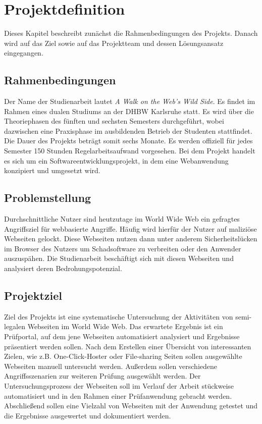 \documentclass[
	pdftex,
	fontsize=12pt,          %
	DIV10,                  %
	ngerman,                %
	paper=a4,               %
	twoside=false,          %
	titlepage,              %
	parskip=half,           %
	headings=normal,        %
	listof=nochaptergap,  %
	bibliography=totoc, %
	index=totoc,            %
	captions=tableheading,  %
	final                 %
]{scrreprt}
\begin{document}
\newpage
\chapter{Projektdefinition}

Dieses Kapitel beschreibt zunächst die Rahmenbedingungen des Projekts. Danach wird auf das Ziel sowie auf das Projektteam und dessen Lösungsansatz eingegangen.

\section{Rahmenbedingungen}

Der Name der Studienarbeit lautet \textit{A Walk on the Web's Wild Side}. Es findet im Rahmen eines dualen Studiums an der DHBW Karlsruhe statt. Es wird über die Theoriephasen des fünften und sechsten Semesters durchgeführt, wobei dazwischen eine Praxisphase im ausbildenden Betrieb der Studenten stattfindet. Die Dauer des Projekts beträgt somit sechs Monate. Es werden offiziell für jedes Semester 150 Stunden Regelarbeitsaufwand vorgesehen. Bei dem Projekt handelt es sich um ein Softwareentwicklungsprojekt, in dem eine Webanwendung konzipiert und umgesetzt wird.


\section{Problemstellung}

Durchschnittliche Nutzer sind heutzutage im World Wide Web ein gefragtes Angriffsziel für webbasierte Angriffe. Häufig wird hierfür der Nutzer auf maliziöse Webseiten gelockt. Diese Webseiten nutzen dann unter anderem Sicherheitslücken im Browser des Nutzers um Schadsoftware zu verbreiten oder den Anwender auszuspähen. Die Studienarbeit beschäftigt sich mit diesen Webseiten und analysiert deren Bedrohungspotenzial.

\section{Projektziel}
Ziel des Projekts ist eine systematische Untersuchung der Aktivitäten von semi-legalen Webseiten im World Wide Web. Das erwartete Ergebnis ist ein Prüfportal, auf dem jene Webseiten automatisiert analysiert und Ergebnisse präsentiert werden sollen. Nach dem Erstellen einer Übersicht von interessanten Zielen, wie z.B. One-Click-Hoster oder File-sharing Seiten sollen ausgewählte Webseiten manuell untersucht werden. Außerdem sollen verschiedene Angriffsszenarien zur weiteren Prüfung ausgewählt werden. Der Untersuchungsprozess der Webseiten soll im Verlauf der Arbeit stückweise automatisiert und in den Rahmen einer Prüfanwendung gebracht werden. Abschließend sollen eine Vielzahl von Webseiten mit der Anwendung getestet und die Ergebnisse ausgewertet und dokumentiert werden.
\end{document}

